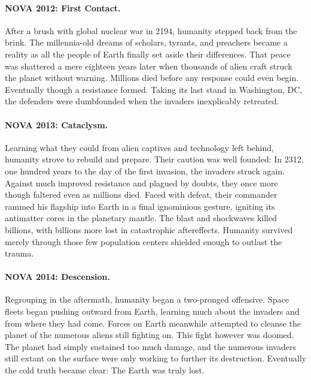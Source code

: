 \documentclass{novanarrative}
\begin{document}
\paragraph{NOVA 2012: First Contact.}  After a brush with global
nuclear war in 2194, humanity stepped back from the brink.  The
millennia-old dreams of scholars, tyrants, and preachers became a
reality as all the people of Earth finally set aside their
differences.  That peace was shattered a mere eighteen years later
when thousands of alien craft struck the planet without warning.
Millions died before any response could even begin.  Eventually though
a resistance formed.  Taking its last stand in Washington, DC, the
defenders were dumbfounded when the invaders inexplicably retreated.

\paragraph{NOVA 2013: Cataclysm.}  Learning what they could from alien
captives and technology left behind, humanity strove to rebuild and
prepare.  Their caution was well founded: In 2312, one hundred years
to the day of the first invasion, the invaders struck again.  Against
much improved resistance and plagued by doubts, they once more though
faltered even as millions died.  Faced with defeat, their commander
rammed his flagship into Earth in a final ignominious gesture,
igniting its antimatter cores in the planetary mantle.  The blast and
shockwaves killed billions, with billions more lost in catastrophic
aftereffects.  Humanity survived merely through those few population
centers shielded enough to outlast the trauma.

\paragraph{NOVA 2014: Descension.} Regrouping in the aftermath,
humanity began a two-pronged offensive.  Space fleets began pushing
outward from Earth, learning much about the invaders and from where
they had come.  Forces on Earth meanwhile attempted to cleanse the
planet of the numerous aliens still fighting on.  This fight however
was doomed.  The planet had simply sustained too much damage, and the
numerous invaders still extant on the surface were only working to
further its destruction.  Eventually the cold truth became clear: The
Earth was truly lost.
\end{document}
